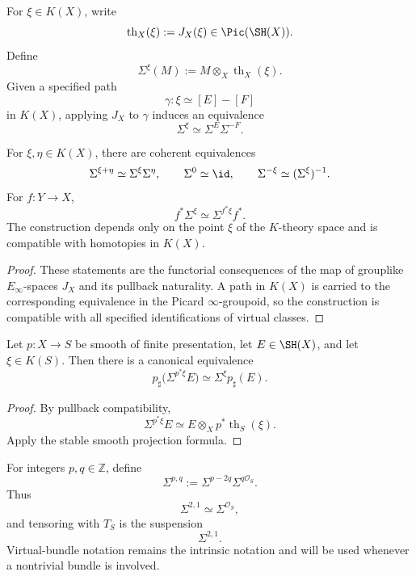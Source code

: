 \begin{definition}
\label{def:virtual-thom-suspension}
For $\xi\in K(X)$, write
\[
    \operatorname{th}_X(\xi)
    :=
    J_X(\xi)
    \in
    \Pic(\SH(X)).
\]
Define
\[
    \Sigma^\xi(M)
    :=
    M\otimes_X\operatorname{th}_X(\xi).
\]
Given a specified path
\[
    \gamma:\xi\simeq[E]-[F]
\]
in $K(X)$, applying $J_X$ to $\gamma$ induces an equivalence
\[
    \Sigma^\xi
    \simeq
    \Sigma^E\Sigma^{-F}.
\]
\end{definition}

\begin{proposition}
\label{prop:virtual-twist-calculus}
For $\xi,\eta\in K(X)$, there are coherent equivalences
\[
    \Sigma^{\xi+\eta}
    \simeq
    \Sigma^\xi\Sigma^\eta,
    \qquad
    \Sigma^0\simeq\id,
    \qquad
    \Sigma^{-\xi}\simeq(\Sigma^\xi)^{-1}.
\]
For $f:Y\to X$,
\[
    f^*\Sigma^\xi
    \simeq
    \Sigma^{f^*\xi}f^*.
\]
The construction depends only on the point $\xi$ of the $K$-theory space and is compatible with
homotopies in $K(X)$.
\end{proposition}

\begin{proof}
These statements are the functorial consequences of the map of grouplike $E_\infty$-spaces
$J_X$ and its pullback naturality.  A path in $K(X)$ is carried to the corresponding equivalence in
the Picard $\infty$-groupoid, so the construction is compatible with all specified identifications of
virtual classes.
\end{proof}

\begin{proposition}
\label{prop:p-sharp-virtual-twist}
Let $p:X\to S$ be smooth of finite presentation, let $E\in\SH(X)$, and let $\xi\in K(S)$.  Then
there is a canonical equivalence
\[
    p_\sharp\bigl(\Sigma^{p^*\xi}E\bigr)
    \simeq
    \Sigma^\xi p_\sharp(E).
\]
\end{proposition}

\begin{proof}
By pullback compatibility,
\[
    \Sigma^{p^*\xi}E
    \simeq
    E\otimes_Xp^*\operatorname{th}_S(\xi).
\]
Apply the stable smooth projection formula.
\end{proof}

\begin{notation}
\label{not:bigraded-suspension}
For integers \(p,q\in\mathbb Z\), define
\[
    \Sigma^{p,q}
    :=
    \Sigma^{p-2q}
    \Sigma^{q\mathcal O_S}.
\]
Thus
\[
    \Sigma^{2,1}
    \simeq
    \Sigma^{\mathcal O_S},
\]
and tensoring with \(T_S\) is the suspension
\[
    \Sigma^{2,1}.
\]
Virtual-bundle notation remains the intrinsic notation and will be used
whenever a nontrivial bundle is involved.
\end{notation}

